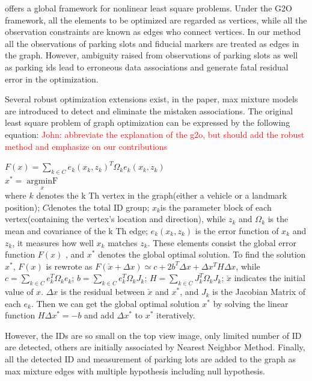 \documentclass[journal]{IEEEtran}
\newcommand{\COMMENT}[1]{\textcolor{red}{#1}}
\begin{document}
\cite{K2011G2o} offers a global framework for nonlinear least square problems. 
Under the G2O framework, all the elements to be optimized are regarded as vertices, while all the observation constraints are known as edges who connect vertices. 
In our method all the observations of parking slots and fiducial markers are treated as edges in the graph. 
However, ambiguity raised from observations of parking slots as well as parking ids lead to erroneous data associations and generate fatal residual error in the optimization. 

Several robust optimization extensions exist, in the paper, max mixture models are introduced
to detect and eliminate the mistaken associations\citep{Pfingsthorn2014Representing}.
The original least square problem of graph optimization can be expressed by the following equation:
\COMMENT{John: abbreviate the explanation of the g2o, but should add the robust method and emphasize on our contributions}

$F(x)=\sum\limits_{k \in C}e_k{(x_k,z_k)}^T{\Omega}_k e_k(x_k,z_k)$\cite{K2011G2o}\\
$x^{*} = \mathop{argminF(x)}\limits_x$\cite{K2011G2o}\\
where $k$ denotes the k Th vertex in the graph(either a vehicle or a landmark position);  
$C$denotes the total ID group; $x_k$is the parameter block of each vertex(containing the vertex’s location and direction), 
while $z_k$ and $\Omega_k$ is the mean and covariance of the k Th edge; 
$e_k(x_k,z_k)$ is the error function of $x_k$ and $z_k$, it measures how well $x_k$ matches $z_k$. 
These elements consist the global error function $F(x)$ , and $x^*$ denotes the global optimal solution.
To find the solution $x^*$, $F(x)$ is rewrote as $F(\check{x}+\Delta x)\simeq c+2b^T \Delta x + \Delta x^T H \Delta x$, 
while $c=\sum\limits_{k \in C}e_k^T \Omega_k e_k$; 
$b=\sum\limits_{k \in C}e_k^T \Omega_k J_k$; 
$H=\sum\limits_{k \in C}J_k^T \Omega_k J_k$; 
$\check{x}$ indicates the initial value of ${x}$. 
$\Delta x$ is the residual between $\check{x}$  and $x^*$, and $J_k$ is the Jacobian Matrix of each $e_k$. 
Then we can get the global optimal solution $x^*$ by solving the linear function $H\Delta x^*=-b$ and add $\Delta x^*$ to $x^*$ iteratively.


However, the IDs are so small on the top view image, only limited number of ID are detected, others are initially associated by Nearest Neighbor Method. 
Finally, all the detected ID and measurement of parking lots are added to the graph as max mixture \cite{Pfingsthorn2014Representing} edges with multiple hypothesis including null hypothesis.
%
\end{document}
